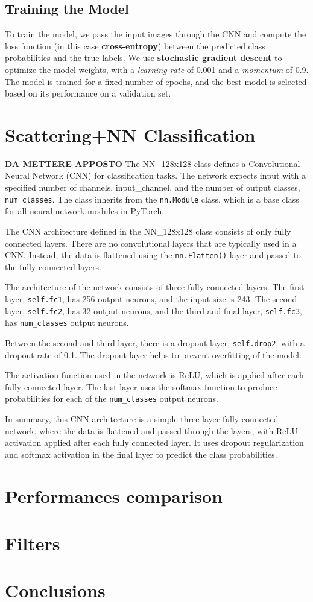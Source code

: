 \documentclass{report}
\begin{document}
\section{Training the Model}

To train the model, we pass the input images through the CNN and compute the loss function (in this case \textbf{cross-entropy}) between the predicted class probabilities and the true labels. We use \textbf{stochastic gradient descent} to optimize the model weights, with a \textit{learning rate} of 0.001 and a \textit{momentum} of 0.9. The model is trained for a fixed number of epochs, and the best model is selected based on its performance on a validation set.

\chapter{Scattering+NN Classification}
\textbf{DA METTERE APPOSTO}
The NN\_128x128 class defines a Convolutional Neural Network (CNN) for classification tasks. The network expects input with a specified number of channels, input\_channel, and the number of output classes, \texttt{num\_classes}. The class inherits from the \texttt{nn.Module} class, which is a base class for all neural network modules in PyTorch.

The CNN architecture defined in the NN\_128x128 class consists of only fully connected layers. There are no convolutional layers that are typically used in a CNN. Instead, the data is flattened using the \texttt{nn.Flatten()} layer and passed to the fully connected layers.

The architecture of the network consists of three fully connected layers. The first layer, \texttt{self.fc1}, has 256 output neurons, and the input size is 243. The second layer, \texttt{self.fc2}, has 32 output neurons, and the third and final layer, \texttt{self.fc3}, has \texttt{num\_classes} output neurons.

Between the second and third layer, there is a dropout layer, \texttt{self.drop2}, with a dropout rate of 0.1. The dropout layer helps to prevent overfitting of the model.

The activation function used in the network is ReLU, which is applied after each fully connected layer. The last layer uses the softmax function to produce probabilities for each of the \texttt{num\_classes} output neurons.

In summary, this CNN architecture is a simple three-layer fully connected network, where the data is flattened and passed through the layers, with ReLU activation applied after each fully connected layer. It uses dropout regularization and softmax activation in the final layer to predict the class probabilities.
\chapter{Performances comparison}
\chapter{Filters}
\chapter{Conclusions}
\end{document}
